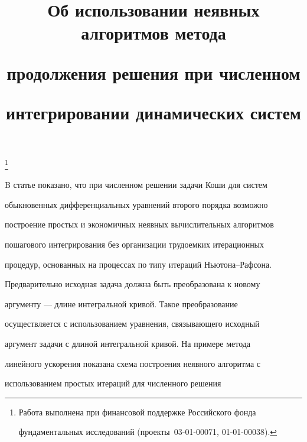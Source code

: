 

\title{Об использовании неявных алгоритмов метода 


продолжения решения при численном 


интегрировании динамических систем} 


\thanks{Работа выполнена при финансовой поддержке Российского фонда 


фундаментальных исследований (проекты \No\No\,03-01-00071, 01-01-00038).} 


 


\date{} 




\pagestyle{plain} %


 




\maketitle 


\label{begin} 


 


 


B статье показано, что при численном решении задачи Коши для систем 


обыкновенных дифференциальных уравнений второго порядка возможно 


построение простых и экономичных неявных вычислительных алгоритмов 


пошагового интегрирования без организации трудоемких итерационных 


процедур, основанных на процессах по типу итераций Ньютона--Рафсона. 


Предварительно исходная задача должна быть преобразована к новому 


аргументу --- длине интегральной кривой. Такое преобразование 


осуществляется с использованием уравнения, связывающего исходный 


аргумент задачи с длиной интегральной кривой. На примере метода 


линейного ускорения показана схема построения неявного алгоритма с 


использованием простых итераций для численного решения 


